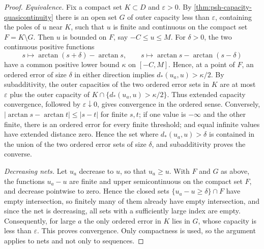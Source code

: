 \begin{proof}
\emph{Equivalence.} Fix a compact set $K\subset D$ and $\varepsilon>0$. By \cref{thm:psh-capacity-quasicontinuity} there is an open set $G$ of outer capacity less than $\varepsilon$, containing the poles of $u$ near $K$, such that $u$ is finite and continuous on the compact set $F=K\setminus G$. Then $u$ is bounded on $F$, say $-C\leq u\leq M$. For $\delta>0$, the two continuous positive functions
\[
 s\longmapsto\arctan(s+\delta)-\arctan s,
 \qquad s\longmapsto\arctan s-\arctan(s-\delta)
\]
have a common positive lower bound $\kappa$ on $[-C,M]$. Hence, at a point of $F$, an ordered error of size $\delta$ in either direction implies $d_*(u_a,u)>\kappa/2$. By subadditivity, the outer capacities of the two ordered error sets in $K$ are at most $\varepsilon$ plus the outer capacity of $K\cap\{d_*(u_a,u)>\kappa/2\}$. Thus extended capacity convergence, followed by $\varepsilon\downarrow0$, gives convergence in the ordered sense. Conversely, $|\arctan s-\arctan t|\leq|s-t|$ for finite $s,t$; if one value is $-\infty$ and the other finite, there is an ordered error for every finite threshold; and equal infinite values have extended distance zero. Hence the set where $d_*(u_a,u)>\delta$ is contained in the union of the two ordered error sets of size $\delta$, and subadditivity proves the converse.

\emph{Decreasing nets.} Let $u_a$ decrease to $u$, so that $u_a\geq u$. With $F$ and $G$ as above, the functions $u_a-u$ are finite and upper semicontinuous on the compact set $F$, and decrease pointwise to zero. Hence the closed sets $\{u_a-u\geq\delta\}\cap F$ have empty intersection, so finitely many of them already have empty intersection, and since the net is decreasing, all sets with a sufficiently large index are empty. Consequently, for large $a$ the only ordered error in $K$ lies in $G$, whose capacity is less than $\varepsilon$. This proves convergence. Only compactness is used, so the argument applies to nets and not only to sequences.


\end{proof}
